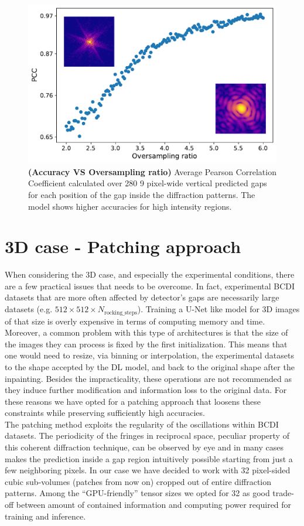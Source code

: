 \begin{figure}[h]
    \centering
    \includegraphics[width=.7\textwidth]{figures/Inpainting/2D_acc_ovs.pdf}
    \caption{\textbf{(Accuracy VS Oversampling ratio)} Average Pearson Correlation Coefficient calculated over 280
    9 pixel-wide vertical predicted gaps for each position of the gap inside the diffraction patterns. The model 
    shows higher accuracies for high intensity regions.}
    \label{fig:accVSovs}
\end{figure}

\section{3D case - Patching approach}\label{sec:patching}

When considering the 3D case, and especially the experimental conditions, there are a few practical issues that needs
to be overcome. In fact, experimental BCDI datasets that are more often affected by detector's gaps are necessarily large
datasets (e.g. $512 \times 512 \times N_{\text{rocking\_steps}}$). Training a U-Net like model for 3D images of that size is 
overly expensive in terms of computing memory and time. Moreover, a common problem with this type of architectures is that
the size of the images they can process is fixed by the first initialization. This means that one would need to resize, via 
binning or interpolation, the experimental datasets to the shape accepted by the DL model, and back to the original
shape after the inpainting. Besides the impracticality, these operations are not recommended as they induce further
modification and information loss to the original data. For these reasons we have opted for a patching approach that 
loosens these constraints while preserving sufficiently high accuracies. \\

The patching method exploits the regularity of the oscillations within BCDI datasets. The periodicity of the fringes 
in reciprocal space, peculiar property of this coherent diffraction technique, can be observed by eye and in many cases 
makes the prediction inside a gap region intuitively possible starting from just a few neighboring pixels. 
In our case we have decided to work with 32 pixel-sided cubic sub-volumes (patches from now on) cropped out of entire diffraction 
patterns. Among the ``GPU-friendly'' tensor sizes \cite{nvidia_tensor_cores_optimization} we opted for 32 as good trade-off
between amount of contained information and computing power required for training and inference. 

